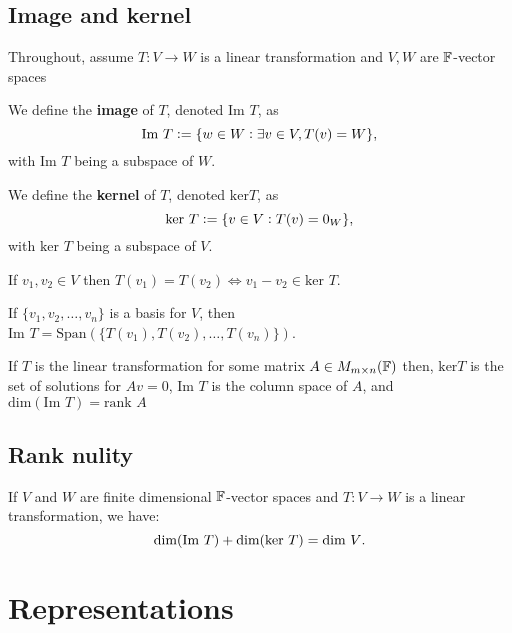 \documentclass[../Year1/Year1.tex]{subfiles}
\begin{document}
\subsection{Image and kernel}
Throughout, assume $T:V\rightarrow W$ is a linear transformation and $V,W$ are $\mathbb{F}$-vector spaces
\begin{definition}[Image]
    We define the \textbf{image} of $T$, denoted $\text{Im }T$, as \[
        \text{Im }T := \{w\in W: \exists v\in V, T(v)=W\}
        \textcolor{black}{,}
    \]
    with $\text{Im }T$ being a subspace of $W$.
\end{definition}

\begin{definition}[Kernel]
    We define the \textbf{kernel} of $T$, denoted $\text{ker}T$, as \[
        \text{ker }T := \{v\in V: T(v)=0_W\}
        \textcolor{black}{,}
    \]
    with $\text{ker }T$ being a subspace of $V$.
\end{definition}

\begin{theorem}
    If $v_1,v_2\in V$ then $T(v_1)=T(v_2) \iff v_1-v_2\in\text{ker }T$.
\end{theorem}

\begin{theorem}
    If $\{v_1,v_2,\ldots,v_n\}$ is a basis for $V$, then $\text{Im }T = \text{Span}(\{T(v_1),T(v_2),\ldots,T(v_n)\})$.
\end{theorem}

\begin{remark}
    If $T$ is the linear transformation for some matrix $A\in M_{m\times n}(\mathbb{F})$ then, $\text{ker} T$ is the set of solutions for $Av=0$, $\text{Im }T$ is the column space of $A$, and $\text{dim}(\text{Im }T)=\text{rank }A$
\end{remark}

\subsection{Rank nulity}

\begin{theorem}
    If $V$ and $W$ are finite dimensional $\mathbb{F}$-vector spaces and $T:V\rightarrow W$ is a linear transformation, we have: \[
        \text{dim}(\text{Im }T) + \text{dim}(\text{ker }T) = \text{dim }V
    \textcolor{black}{.}
    \]
\end{theorem}

\section{Representations}
\end{document}
